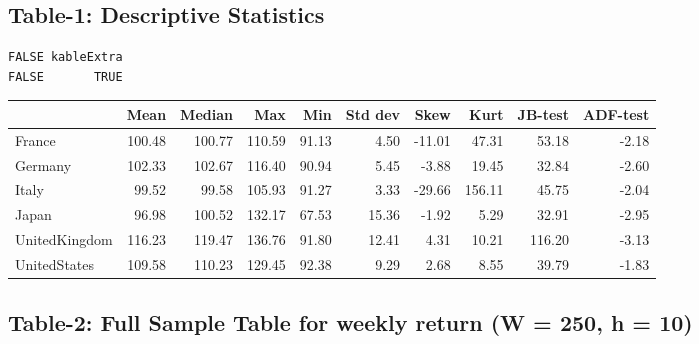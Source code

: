 \documentclass[]{elsarticle} %
\begin{document}
\subsection{\texorpdfstring{\textbf{Table-1: Descriptive
Statistics}}{Table-1: Descriptive Statistics}}\label{table-1-descriptive-statistics}

\begin{verbatim}
FALSE kableExtra 
FALSE       TRUE
\end{verbatim}

\begin{tabular}{lrrrrrrrrr}
\toprule
  & Mean & Median & Max & Min & Std dev & Skew & Kurt & JB-test & ADF-test\\
\midrule
France & 100.48 & 100.77 & 110.59 & 91.13 & 4.50 & -11.01 & 47.31 & 53.18 & -2.18\\
Germany & 102.33 & 102.67 & 116.40 & 90.94 & 5.45 & -3.88 & 19.45 & 32.84 & -2.60\\
Italy & 99.52 & 99.58 & 105.93 & 91.27 & 3.33 & -29.66 & 156.11 & 45.75 & -2.04\\
Japan & 96.98 & 100.52 & 132.17 & 67.53 & 15.36 & -1.92 & 5.29 & 32.91 & -2.95\\
UnitedKingdom & 116.23 & 119.47 & 136.76 & 91.80 & 12.41 & 4.31 & 10.21 & 116.20 & -3.13\\
UnitedStates & 109.58 & 110.23 & 129.45 & 92.38 & 9.29 & 2.68 & 8.55 & 39.79 & -1.83\\
\bottomrule
\end{tabular}

\subsection{\texorpdfstring{\textbf{Table-2: Full Sample Table for
weekly return (W = 250, h =
10)}}{Table-2: Full Sample Table for weekly return (W = 250, h = 10)}}\label{table-2-full-sample-table-for-weekly-return-w-250-h-10}
\end{document}
